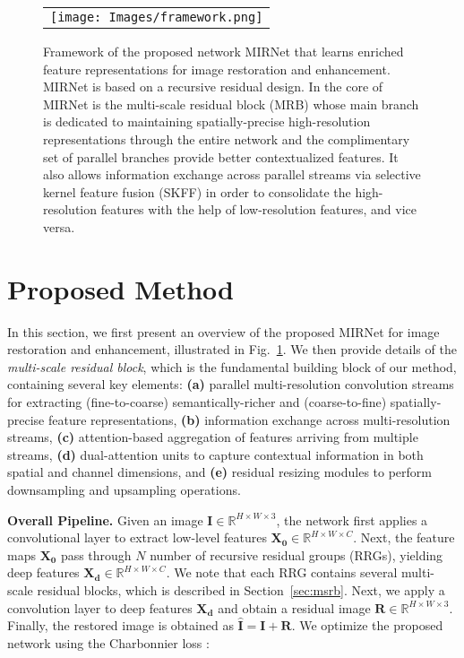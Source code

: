\documentclass[runningheads]{llncs}
\begin{document}
\begin{figure}[t]
\begin{center}
\begin{tabular}[t]{c} \hspace{-2mm}
\texttt{[image: Images/framework.png]}
\end{tabular}
\end{center}
\vspace*{-4mm}
\caption{\small Framework of the proposed network MIRNet that learns enriched feature representations for image restoration and enhancement. MIRNet is based on a recursive residual design. In the core of MIRNet is the multi-scale residual block (MRB) whose main branch is dedicated to maintaining spatially-precise high-resolution representations through the entire  network and the complimentary set of parallel branches provide better contextualized features. It also allows information exchange across parallel streams via selective kernel feature fusion (SKFF) in order to consolidate the high-resolution features with the help of low-resolution features, and vice versa.}
\label{fig:framework}
\vspace{-1em}
\end{figure}

\section{Proposed Method}
In this section, we first present an overview of the proposed MIRNet for image restoration and enhancement, illustrated in Fig.~\ref{fig:framework}.
We then provide details of the \emph{multi-scale residual block}, which is the fundamental building block of our method, containing several key elements: \textbf{(a)} parallel multi-resolution convolution streams for extracting (fine-to-coarse) semantically-richer and (coarse-to-fine) spatially-precise feature representations, \textbf{(b)} information exchange across multi-resolution streams, \textbf{(c)} attention-based aggregation of features arriving from multiple streams, \textbf{(d)} dual-attention units to capture contextual information in both spatial and channel dimensions, and \textbf{(e)} residual resizing modules to perform downsampling and upsampling operations.   



\vspace{0.4em} \noindent \textbf{Overall Pipeline.} 
Given an image $\mathbf{I} \in \mathbb{R}^{H\times W \times 3}$, the network first applies a convolutional layer to extract low-level features $\mathbf{X_0} \in \mathbb{R}^{H\times W \times C}$.
Next, the feature maps $\mathbf{X_0}$ pass through $N$ number of recursive residual groups (RRGs), yielding deep features $\mathbf{X_d} \in \mathbb{R}^{H\times W \times C}$. 
We note that each RRG contains several multi-scale residual blocks, which is described in Section~\ref{sec:msrb}. 
Next, we apply a convolution layer to deep features $\mathbf{X_d}$ and obtain a residual image $\mathbf{R} \in \mathbb{R}^{H\times W \times 3}$. 
Finally, the restored image is obtained as $\mathbf{\hat{I}} = \mathbf{I} + \mathbf{R}$.   
We optimize the proposed network using the Charbonnier loss \cite{charbonnier1994}: 
\end{document}
